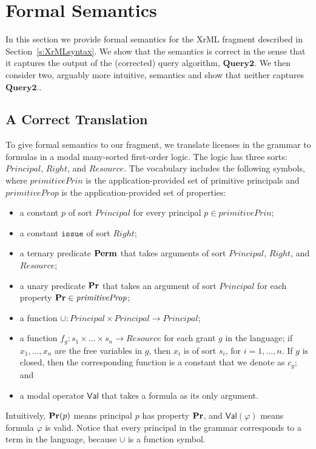 \documentclass{acmtrans2m}
\newcommand{\<}{
}
\renewcommand{\>}{\rangle}
\newcommand{\union}{\cup}
\renewcommand{\phi}{\varphi}
\newcommand{\Permitted}{\mathit{\bf Perm}}
\renewcommand{\Pr}{\mathit{\bf Pr}}
\newcommand{\issue}{\mathtt{issue}}
\newcommand{\primitiveProp}{\mathit{primitiveProp}}
\newcommand{\primitivePrinc}{\mathit{primitivePrin}}
\newcommand{\XProcTwo}{\textbf{Query2}}
\newcommand{\Princ}{\mathit{Principal}}
\newcommand{\Rht}{\mathit{Right}}
\newcommand{\Rsrc}{\mathit{Resource}}
\newcommand{\Val}{\mathsf{Val}}
\begin{document}
\section{Formal Semantics}\label{s:semantics-xrml}
In this section we provide formal semantics for the XrML fragment described in
Section~\ref{s:XrMLsyntax}.
We show that the semantics is correct 
in the sense that 
it captures the output of the (corrected) query algorithm, $\XProcTwo$.
We then consider two, arguably more intuitive,
semantics and show that neither captures $\XProcTwo$..

\subsection{A Correct Translation}\label{s:correctSemantics}
To give formal semantics to our fragment, we translate licenses in the grammar to formulas
in a modal many-sorted first-order logic.
The logic has three sorts: $\Princ$, $\Rht$, and $\Rsrc$.  The vocabulary includes
the following symbols, where $\primitivePrinc$ is the application-provided set of primitive
principals and $\primitiveProp$ is the application-provided set of properties:
\begin{itemize}
\item a constant $p$ of sort $\Princ$ for every principal $p \in \primitivePrinc$;
\item a constant $\issue$ of sort $\Rht$;
\item a ternary predicate $\Permitted$ that takes arguments of sort $\Princ$, $\Rht$, and
$\Rsrc$;
\item a unary predicate $\Pr$ that takes an argument of sort $\Princ$ for each property
$\Pr \in \primitiveProp$;
\item a function $\union: \Princ\times\Princ\longrightarrow\Princ$;
\item a function $f_g: s_1\times\ldots\times s_n\longrightarrow\Rsrc$ for each grant $g$ in
the language; if $x_1, \ldots, x_n$ are the free variables in $g$, then $x_i$ is of sort
$s_i$, for $i = 1, \ldots, n$.  If $g$ is closed, then the corresponding function is a
constant that we denote as $c_g$; and
\item a modal operator $\Val$ that takes a formula as its only argument.
\end{itemize}
Intuitively, $\Pr(p)$ means principal $p$ has property $\Pr$, and $\Val(\phi)$ means formula
$\phi$ is valid.  Notice that every principal in the grammar corresponds to a term in the
language, because $\union$ is a function symbol.
\end{document}
